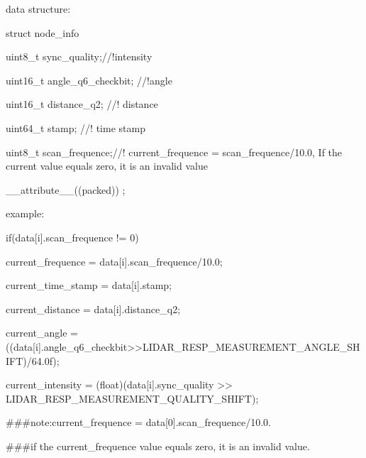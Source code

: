 data structure\+: \begin{DoxyVerb}struct node_info {

   uint8_t    sync_quality;//!intensity

   uint16_t   angle_q6_checkbit; //!angle

   uint16_t   distance_q2; //! distance

   uint64_t   stamp; //! time stamp

   uint8_t    scan_frequence;//! current_frequence = scan_frequence/10.0, If the current value equals zero, it is an invalid value

} __attribute__((packed)) ;
\end{DoxyVerb}


example\+: \begin{DoxyVerb}if(data[i].scan_frequence != 0) {

    current_frequence = data[i].scan_frequence/10.0;
}

current_time_stamp = data[i].stamp;

current_distance = data[i].distance_q2;

current_angle = ((data[i].angle_q6_checkbit>>LIDAR_RESP_MEASUREMENT_ANGLE_SHIFT)/64.0f);

current_intensity = (float)(data[i].sync_quality >> LIDAR_RESP_MEASUREMENT_QUALITY_SHIFT);

###note:current_frequence = data[0].scan_frequence/10.0.

###if the current_frequence value equals zero, it is an invalid value.
\end{DoxyVerb}


